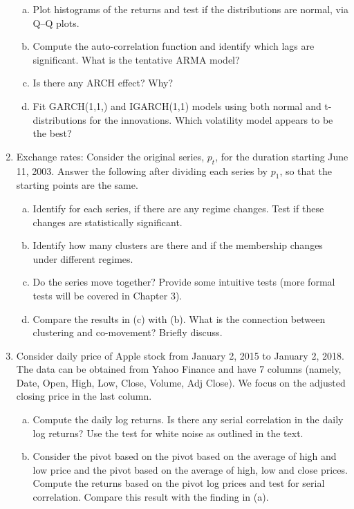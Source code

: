 \begin{enumerate}[1.]
\begin{enumerate}[(a)]
\item Plot histograms of the returns and test if the distributions are normal, via Q--Q plots.

\item Compute the auto-correlation function and identify which lags are significant. What is the tentative ARMA model?

\item Is there any ARCH effect? Why?

\item Fit GARCH(1,1,) and IGARCH(1,1) models using both normal and t-distributions for the innovations. Which volatility model appears to be the best?
\end{enumerate}

 \item Exchange rates: Consider the original series, $p_t$, for the duration starting June 11, 2003.
 Answer the following after dividing each series by $p_1$, so that the starting points are the same.
\begin{enumerate}[(a)]
\item Identify for each series, if there are any regime changes. Test if these changes are statistically significant.

\item Identify how many clusters are there and if the membership changes under different regimes.

\item Do the series move together? Provide some intuitive tests (more formal tests will be covered in Chapter 3). 

\item Compare the results in (c)  with (b). What is the connection between clustering and co-movement? Briefly discuss.
\end{enumerate}


\item Consider daily price of Apple stock from January 2, 2015 to January 2, 2018. The data can be obtained from Yahoo Finance and have 7 columns (namely, Date, Open, High, Low, Close, Volume, Adj Close). We focus on the adjusted closing price in the last column.
\begin{enumerate}[(a)]
\item Compute the daily log returns. Is there any serial correlation in the daily log returns? Use the test for white noise as outlined in the text. 

\item Consider the pivot based on the pivot based on the average of high and low price and the pivot based on the average of high, low and close prices. Compute the returns based on the pivot log prices and test for serial correlation. Compare this result with the finding in (a). 


\end{enumerate}
\end{enumerate}
